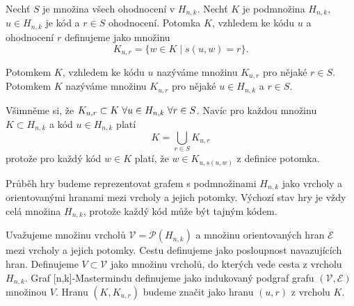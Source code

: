 \begin{definice}[Potomek]\label{potomek}
  Nechť $S$ je množina všech ohodnocení v $H_{n,k}$. Nechť $K$ je podmnožina $H_{n,k}$, $ u \in H_{n,k}$ je kód a $r \in S$ ohodnocení. Potomka $K$, vzhledem ke kódu $u$ a ohodnocení $r$ definujeme jako množinu 
  \[K_{u,r} = \{w \in K \mid s(u,w) = r\}.\] 
\end{definice}

\begin{pozn}
    Potomkem $K$, vzhledem ke kódu $u$ nazýváme množinu $K_{u,r}$ pro nějaké $r \in S$. Potomkem $K$ nazýváme množinu $K_{u,r}$ pro nějaké $u\in H_{n,k}$ a $r \in S$. 
\end{pozn}

\begin{pozn}
    Všimněme si, že $K_{u,r} \subset K \hspace{3px}\forall u\in H_{n,k} \hspace{3px}\forall r\in S$. Navíc pro každou množinu $K \subset H_{n,k}$ a kód $u \in H_{n,k}$ platí
    \[K = \bigcup_{r\in S} K_{u,r}\]
    protože pro každý kód $w \in K$ platí, že $w \in K_{u, s(u,w)}$ z definice potomka.
\end{pozn}

Průběh hry budeme reprezentovat grafem s podmnožinami $H_{n,k}$ jako vrcholy a orientovanými hranami mezi vrcholy a jejich potomky. Výchozí stav hry je vždy celá množina $H_{n,k}$, protože každý kód může být tajným kódem. 

\begin{definice}
  Uvažujeme množinu vrcholů $\mathcal{V} = \mathcal{P}(H_{n,k})$ a množinu orientovaných hran $\mathcal{E}$ mezi vrcholy a jejich potomky. Cestu definujeme jako posloupnost navazujících hran. Definujeme $V \subset \mathcal{V}$ jako množinu vrcholů, do kterých vede cesta z vrcholu $H_{n,k}$. Graf [n,k]-Mastermindu definujeme jako indukovaný podgraf grafu $(\mathcal{V}, \mathcal{E})$ množinou $V$. Hranu $(K, K_{u,r})$ budeme značit jako hranu $(u,r)$ z vrcholu $K$.
\end{definice}
 
